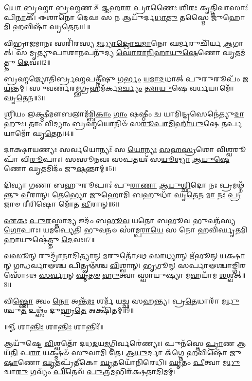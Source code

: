 

\-\ul{𑌯𑍋} \ul{𑌬𑍍𑌰}\-𑌹𑍍𑌮𑌾 𑌬𑍍𑌰𑌹𑍍𑌮𑌣 𑌉᳴𑌜𑍍𑌜\-\ul{𑌹𑌾}\-\-\ul{𑌰} \ul{𑌪𑍍𑌰𑌾}\-𑌣𑍈𑌃 𑌶𑌿\-\ul{𑌰𑌃} 𑌕𑍃𑌤𑍍𑌤𑌿𑌵𑌾𑌸𑌾𑌃॑ 𑌪𑌿\-\ul{𑌨𑌾}\-𑌕𑍀।
𑌈𑌶𑌾𑌨𑍋 𑌦𑍇𑌵𑌃 𑌸 𑌨 𑌆𑌯𑍁᳴𑌰𑍍𑌦\-\ul{𑌧𑌾}\-\-\ul{𑌤𑍁} 𑌤𑌸𑍍𑌮𑍈 𑌜𑍁𑌹𑍋𑌮𑌿 𑌹𑌵𑌿𑌷𑌾᳴ 𑌘𑍃\-\ul{𑌤𑍇}\-𑌨॥1॥

𑌵𑌿𑌭𑍍𑌰𑌾𑌜𑌮𑌾𑌨𑌃 𑌸𑌰𑌿᳴𑌰𑌸𑍍𑌯 \ul{𑌮}\-\-\ul{𑌧𑍍𑌯𑌾}\-\-\ul{𑌦𑍍𑌰𑍋}\-\-\ul{𑌚}\-\-\ul{𑌮𑌾}\-𑌨𑍋 𑌘𑌰𑍍𑌮𑌰𑍁𑌚𑌿᳴𑌰𑍍𑌯 \ul{𑌆}\-𑌗𑌾𑌤𑍍।
𑌸 𑌮𑍃𑌤𑍍𑌯𑍁𑌪𑌾𑌶𑌾𑌨𑌪𑌨𑍁᳴𑌦𑍍𑌯 \ul{𑌘𑍋}\-\-\ul{𑌰𑌾}\-\-\ul{𑌨𑌿}\-\-\ul{𑌹𑌾}\-\-\ul{𑌯𑍁}\-\-\ul{𑌷𑍇}\-𑌣𑍋 𑌘𑍃𑌤𑌮᳴𑌤𑍍𑌤𑍁 \ul{𑌦𑍇}\-𑌵𑌃॥2॥

𑌬𑍍𑌰𑌹𑍍𑌮𑌜𑍍𑌯𑍋𑌤𑌿𑌰𑍍𑌬𑍍𑌰𑌹𑍍𑌮𑌪𑌤𑍍𑌨𑍀᳴𑌷𑍁  \ul{𑌗}\-\-\ul{𑌰𑍍𑌭𑌂} \ul{𑌯}\-\-\ul{𑌮𑌾}\-\-\ul{𑌦}\-𑌧𑌾𑌤𑍍 𑌪𑍁𑌰𑍁𑌰𑍂𑌪𑌂᳴ 𑌜\-\ul{𑌯}\-𑌨𑍍𑌤𑌮𑍍।
𑌸𑍁𑌵𑌰𑍍𑌣𑌰𑌮𑍍𑌭𑌗𑍍𑌰𑌹𑌮᳴𑌰𑍍𑌕\-\ul{𑌮}\-\-\ul{𑌰𑍍𑌚𑍍𑌯𑌂} \ul{𑌤}\-\-\ul{𑌮𑌾}\-\-\ul{𑌯𑍁}\-𑌷𑍇 𑌵𑌰𑍍𑌧𑌯𑌾𑌮𑍋᳴ 𑌘𑍃\-\ul{𑌤𑍇}\-𑌨॥3॥

𑌶𑍍𑌰𑌿𑌯𑌂 𑌲𑌕𑍍𑌷𑍍𑌮𑍀𑌮𑍗𑌬𑌲𑌾𑌮᳴𑌮𑍍𑌬𑌿\-\ul{𑌕𑌾𑌂} \ul{𑌗𑌾𑌂} 𑌷𑌷𑍍𑌠𑍀𑌂 𑌚 𑌯𑌾𑌮𑌿𑌨𑍍𑌦𑍍𑌰𑌸𑍇𑌨𑍇॑𑌤𑍍𑌯𑍁\-\ul{𑌦𑌾}\-𑌹𑍁𑌃।
𑌤𑌾𑌂 𑌵𑌿𑌦𑍍𑌯𑌾𑌂 𑌬𑍍𑌰𑌹𑍍𑌮𑌯𑍋𑌨𑌿𑍞᳴ 𑌸\-\ul{𑌰𑍂}\-\-\ul{𑌪𑌾}\-\-\ul{𑌮𑌿}\-\-\ul{𑌹𑌾}\-\-\ul{𑌯𑍁}\-𑌷𑍇 𑌤𑌰𑍍𑌪𑌯𑌾𑌮𑍋᳴ 𑌘𑍃\-\ul{𑌤𑍇}\-𑌨॥4॥

𑌦𑌾𑌕𑍍𑌷𑌾𑌯𑌣𑍍𑌯𑌃 𑌸𑌰𑍍𑌵𑌯𑍋𑌨𑍍𑌯𑌃᳴ 𑌸 \ul{𑌯𑍋}\-\-\ul{𑌨𑍍𑌯𑌃} \ul{𑌸}\-\-\ul{𑌹}\-\-\ul{𑌸𑍍𑌰}\-𑌶𑍋 𑌵𑌿𑌶𑍍𑌵𑌰𑍂𑌪𑌾᳴ 𑌵𑌿\-\ul{𑌰𑍂}\-𑌪𑌾𑌃।
𑌸𑌸𑍂𑌨𑌵𑌃 𑌸𑌪𑌤𑌯𑌃᳴ 𑌸\-\ul{𑌯𑍂}\-\-\ul{𑌥𑍍𑌯𑌾} \ul{𑌆}\-\-\ul{𑌯𑍁}\-\-\ul{𑌷𑍇}\-𑌣𑍋 𑌘𑍃𑌤𑌮𑌿𑌦𑌂᳴ 𑌜𑍁\-\ul{𑌷}\-𑌨𑍍𑌤𑌾𑌮𑍍॥5॥

𑌦𑌿𑌵𑍍𑌯𑌾 𑌗𑌣𑌾 𑌬𑌹𑍁𑌰𑍂𑌪𑌾𑌃॑ 𑌪𑍁\-\ul{𑌰𑌾}\-\-\ul{𑌣𑌾} \ul{𑌆}\-\-\ul{𑌯𑍁}\-\-\ul{𑌶𑍍𑌛𑌿}\-𑌦𑍋 𑌨𑌃 𑌪𑍍𑌰𑌮𑌥𑍍𑌨᳴𑌨𑍍𑌤𑍁 \ul{𑌵𑍀}\-𑌰𑌾𑌨𑍍।
𑌤𑍇𑌭𑍍𑌯𑍋 𑌜𑍁𑌹𑍋𑌮𑌿 𑌬𑌹𑍁𑌧𑌾᳴ 𑌘𑍃\-\ul{𑌤𑍇}\-\-\ul{𑌨} \ul{𑌮𑌾} \ul{𑌨𑌃} \ul{𑌪𑍍𑌰}\-𑌜𑌾𑍞 𑌰𑍀𑌰𑌿𑌷𑍋 𑌮𑍋᳴𑌤 \ul{𑌵𑍀}\-𑌰𑌾𑌨𑍍॥6॥

\-\ul{𑌏}\-\-\ul{𑌕𑌃} \ul{𑌪𑍁}\-\-\ul{𑌰}\-𑌸𑍍𑌤𑌾𑌦𑍍𑌯 𑌇𑌦𑌂᳴ 𑌬\-\ul{𑌭𑍂}\-\-\ul{𑌵} 𑌯𑌤𑍋 𑌬𑌭𑍂𑌵 𑌭𑍁𑌵𑌨᳴𑌸𑍍𑌯 \ul{𑌗𑍋}\-𑌪𑌾𑌃।
𑌯𑌮𑌪𑍍𑌯𑍇𑌤𑌿 𑌭𑍁𑌵𑌨𑍞 𑌸𑌾॑𑌮𑍍𑌪\-\ul{𑌰𑌾}\-\-\ul{𑌯𑍇} 𑌸 𑌨𑍋 𑌹𑌵𑌿𑌰𑍍𑌘𑍃𑌤𑌮𑌿𑌹𑌾𑌯𑍁𑌷𑍇॑𑌤𑍍𑌤𑍁 \ul{𑌦𑍇}\-𑌵𑌃॥7॥

\-\ul{𑌵}\-\-\ul{𑌸𑍂}\-𑌨𑍍 𑌰𑍁𑌦𑍍𑌰𑌾᳴𑌨𑌾\-\ul{𑌦𑌿}\-\-\ul{𑌤𑍍𑌯𑌾}\-𑌨𑍍 𑌮𑌰𑍁𑌤𑍋᳴𑌽𑌥 \ul{𑌸𑌾}\-\-\ul{𑌧𑍍𑌯𑌾}\-𑌨𑍍 𑌋᳴𑌭𑍂𑌨𑍍 \ul{𑌯}\-\-\ul{𑌕𑍍𑌷𑌾}\-𑌨𑍍 𑌗𑌨𑍍𑌧𑌰𑍍𑌵𑌾𑍟𑌶𑍍𑌚 𑌪𑌿𑌤𑍄𑍟᳴𑌶𑍍𑌚 \ul{𑌵𑌿}\-𑌶𑍍𑌵𑌾𑌨𑍍।
 𑌭𑍃𑌗𑍂𑌨𑍍 𑌸𑌰𑍍𑌪𑌾𑍟𑌶𑍍𑌚𑌾𑌙𑍍𑌗𑌿𑌰𑌸𑍋᳴𑌽𑌥 \ul{𑌸}\-\-\ul{𑌰𑍍𑌵𑌾}\-𑌨𑍍 \ul{𑌘𑍃}\-\-\ul{𑌤}\-\-\ul{𑍞} \ul{𑌹𑍁}\-𑌤𑍍𑌵𑌾 𑌸𑍍𑌵𑌾𑌯𑍁𑌷𑍍𑌯𑌾 𑌮𑌹𑌯𑌾᳴𑌮 \ul{𑌶}\-𑌶𑍍𑌵𑌤𑍍॥8॥

𑌵𑌿\-\ul{𑌷𑍍𑌣𑍋} 𑌤𑍍𑌵𑌂 \ul{𑌨𑍋} 𑌅𑌨𑍍𑌤᳴\-\ul{𑌮𑌃} 𑌶𑌰𑍍𑌮᳴ 𑌯𑌚𑍍𑌛 𑌸𑌹𑌨𑍍𑌤𑍍𑌯।
𑌪𑍍𑌰\-\ul{𑌤𑍇}\-𑌧𑌾𑌰𑌾᳴ 𑌮\-\ul{𑌧𑍁}\-𑌶𑍍𑌚𑍁\-\ul{𑌤} 𑌉𑌥𑍍𑌸𑌂᳴ 𑌦𑍁𑌹𑍍𑌰\-\ul{𑌤𑍇} 𑌅𑌕𑍍𑌷𑌿᳴𑌤𑌮𑍍॥9॥

\centerline{॥𑍐 𑌶𑌾\-\ul{𑌨𑍍𑌤𑌿𑌃} 𑌶𑌾\-\ul{𑌨𑍍𑌤𑌿𑌃} 𑌶𑌾𑌨𑍍𑌤𑌿𑌃᳴॥}
\vspace{-0.25ex}
\closesection
\vspace{-0.25ex}
𑌆𑌯𑍁᳴𑌷𑍍𑌟𑍇 \ul{𑌵𑌿}\-𑌶𑍍𑌵𑌤𑍋᳴ 𑌦𑌧\-\ul{𑌦}\-𑌯\-\ul{𑌮}\-𑌗𑍍𑌨𑌿𑌰𑍍𑌵𑌰𑍇॑𑌣𑍍𑌯𑌃। 𑌪𑍁𑌨᳴𑌸𑍍𑌤𑍇 \ul{𑌪𑍍𑌰𑌾}\-𑌣 𑌆𑌯᳴\-\ul{𑌤𑌿} 𑌪\-\ul{𑌰𑌾} 𑌯𑌕𑍍𑌷𑍍𑌮𑍞᳴ 𑌸𑍁𑌵𑌾𑌮𑌿 𑌤𑍇। \ul{𑌆}\-\-\ul{𑌯𑍁}\-𑌰𑍍𑌦𑌾 𑌅᳴𑌗𑍍𑌨𑍇 \ul{𑌹}\-𑌵𑌿𑌷𑍋᳴ 𑌜𑍁\-\ul{𑌷𑌾}\-𑌣𑍋 \ul{𑌘𑍃}\-𑌤𑌪𑍍𑌰᳴𑌤𑍀𑌕𑍋 \ul{𑌘𑍃}\-𑌤𑌯𑍋᳴𑌨𑌿𑌰𑍇𑌧𑌿। \ul{𑌘𑍃}\-𑌤𑌂 \ul{𑌪𑍀}\-𑌤𑍍𑌵𑌾 𑌮\-\ul{𑌧𑍁} 𑌚𑌾\-\ul{𑌰𑍁} 𑌗𑌵𑍍𑌯𑌂᳴ \ul{𑌪𑌿}\-𑌤𑍇𑌵᳴ \ul{𑌪𑍁}\-𑌤𑍍𑌰\-\ul{𑌮}\-𑌭𑌿𑌰᳴𑌕𑍍𑌷𑌤𑌾\-\ul{𑌦𑌿}\-𑌮𑌮𑍍।
